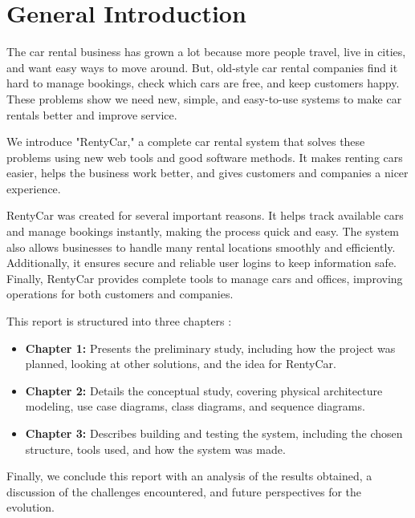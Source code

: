 \chapter*{General Introduction}

The car rental business has grown a lot because more people travel, live in cities, and want easy ways to move around. But, old-style car rental companies find it hard to manage bookings, check which cars are free, and keep customers happy. These problems show we need new, simple, and easy-to-use systems to make car rentals better and improve service. 

We introduce "RentyCar," a complete car rental system that solves these problems using new web tools and good software methods. It makes renting cars easier, helps the business work better, and gives customers and companies a nicer experience. 

RentyCar was created for several important reasons. It helps track available cars and manage bookings instantly, making the process quick and easy. The system also allows businesses to handle many rental locations smoothly and efficiently. Additionally, it ensures secure and reliable user logins to keep information safe. Finally, RentyCar provides complete tools to manage cars and offices, improving operations for both customers and companies.

This report is structured into three chapters :
\begin{itemize}
    \item \textbf{Chapter 1:} Presents the preliminary study, including how the project was planned, looking at other solutions, and the idea for RentyCar.
    
    \item \textbf{Chapter 2:} Details the conceptual study, covering physical architecture modeling, use case diagrams, class diagrams, and sequence diagrams.
    
    \item \textbf{Chapter 3:} Describes building and testing the system, including the chosen structure, tools used, and how the system was made.
\end{itemize}
Finally, we conclude this report with an analysis of the results obtained, a discussion
of the challenges encountered, and future perspectives for the evolution.


